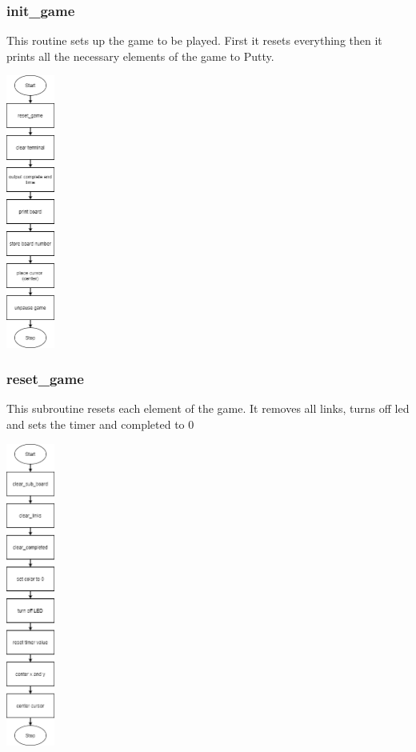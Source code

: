 \documentclass{article}
\begin{document}
    \subsubsection{init\_game}
        This routine sets up the game to be played.  First it resets everything
        then it prints all the necessary elements of the game to Putty.
        \begin{center}
            {\includegraphics[height=9cm]{init_game.png}\centering} 
        \end{center}
        \newpage

    \subsubsection{reset\_game}
        This subroutine resets each element of the game. It removes all
        links, turns off led and sets the timer and completed to 0
        \begin{center}
            {\includegraphics[height=10cm]{reset_game.png}\centering} 
        \end{center}
        \newpage
\end{document}
